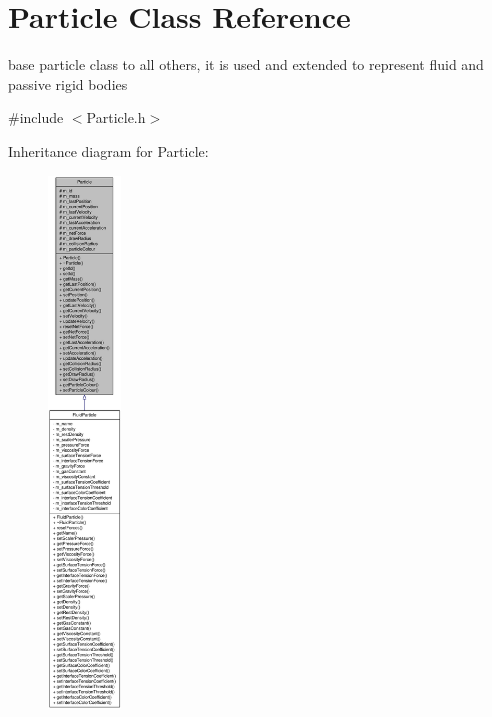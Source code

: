 \hypertarget{class_particle}{
\section{Particle Class Reference}
\label{class_particle}
}


base particle class to all others, it is used and extended to represent fluid and passive rigid bodies  




{\ttfamily \#include $<$Particle.h$>$}



Inheritance diagram for Particle:\nopagebreak
\begin{figure}[H]
\begin{center}
\leavevmode
\includegraphics[height=400pt]{class_particle__inherit__graph}
\end{center}
\end{figure}
